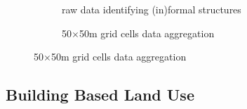 \documentclass[12pt]{article}
\begin{document}
\begin{figure}[t!]
        \centering
        \caption[ Building-Based Land Use Data ]
        {\small Building-Based Land Use Data } 
        \vspace{2mm}
        \begin{subfigure}[b]{0.48\textwidth}
            \centering
            \caption[Network2]%
            {{\small raw data identifying (in)formal structures}}    
        \end{subfigure}
        \hfill\quad
        \begin{subfigure}[b]{0.48\textwidth}  
            \centering 
            \caption[]%
            {{\small 50$\times$50m grid cells data aggregation}}    
        \end{subfigure}
        \label{fig:bblumaps}
    \end{figure} 

\subsection{Building Based Land Use}
\label{section:data:bblu}
\end{document}
